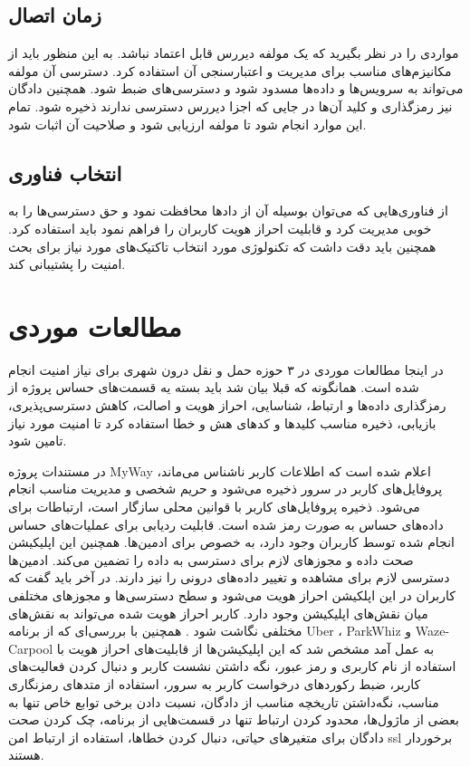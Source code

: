 \subsection{زمان اتصال}
مواردی را در نظر بگیرید که یک مولفه دیررس قابل اعتماد نباشد. 
به این منظور باید از مکانیزم‌های مناسب برای مدیریت و اعتبارسنجی آن‌ استفاده کرد. دسترسی آن مولفه می‌تواند به سرویس‌ها و داده‌ها مسدود شود و دسترسی‌های ضبط شود. همچنین دادگان نیز رمزگذاری و کلید آن‌ها در جایی که اجزا دیررس دسترسی ندارند ذخیره شود. تمام این موارد انجام شود تا مولفه ارزیابی شود و صلاحیت آن اثبات شود.

\subsection{انتخاب فناوری}
از فناوری‌هایی که می‌توان بوسیله آن از داد‌ها محافظت نمود و حق دسترسی‌ها را به خوبی مدیریت کرد و قابلیت احراز هویت کاربران را فراهم نمود باید استفاده کرد.
همچنین باید دقت داشت که تکنولوژی مورد انتخاب تاکتیک‌های مورد نیاز برای بحث امنیت را پشتیبانی کند.


\section{مطالعات موردی}
در اینجا مطالعات موردی در ۳ حوزه حمل و نقل درون شهری برای نیاز امنیت انجام شده است.
همانگونه که قبلا بیان شد باید بسته یه قسمت‌های حساس پروژه از رمزگذاری داد‌ه‌ها و ارتباط، شناسایی، احراز هویت و اصالت، کاهش دسترسی‌پذیری، بازیابی، ذخیره مناسب کلید‌ها و کدهای هش و خطا استفاده کرد تا امنیت مورد نیاز تامین شود.
 
در مستندات پروژه MyWay اعلام شده است که اطلاعات کاربر ناشناس می‌ماند، پروفایل‌های کاربر در سرور ذخیره می‌شود و حریم شخصی و مدیریت مناسب انجام می‌شود. ذخیره پروفایل‌های کاربر با قوانین محلی سازگار است، ارتباطات برای داده‌های حساس به صورت رمز شده است.  قابلیت ردیابی برای عملیات‌های حساس انجام شده توسط کاربران وجود دارد، به خصوص برای ادمین‌ها. همچنین این اپلیکیشن صحت داده و مجوز‌های لازم برای دسترسی به داده را تضمین می‌کند. ادمین‌ها دسترسی لازم برای مشاهده و تغییر داده‌های درونی را نیز دارند.
در آخر باید گفت که کاربران در این اپلکیشن احراز هویت می‌شود و سطح دسترسی‌ها و مجوزهای مختلفی میان نقش‌های اپلیکیشن وجود دارد. کاربر احراز هویت شده می‌تواند به نقش‌های مختلفی نگاشت شود \cite{myway_req}.
همچنین با بررسی‌ای که از برنامه Uber ، ParkWhiz و Waze-Carpool به عمل آمد مشخص شد که این اپلیکیشن‌ها از قابلیت‌های احراز هویت با استفاده از نام کاربری و رمز عبور، نگه داشتن نشست کاربر و دنبال کردن فعالیت‌های کاربر، ضبط رکوردهای درخواست کاربر به سرور، استفاده از متد‌های رمزنگاری مناسب، نگه‌داشتن تاریخچه مناسب از دادگان، نسبت دادن برخی توابع خاص تنها به بعضی از ماژول‌ها، محدود کردن ارتباط تنها در قسمت‌هایی از برنامه،‌ چک کردن صحت دادگان برای متغیرهای حیاتی، دنبال کردن خطاها، استفاده از ارتباط امن ssl  برخوردار هستند.


